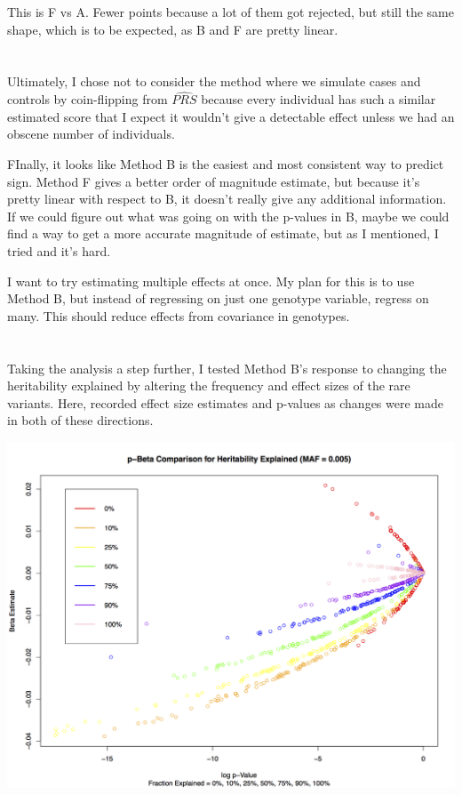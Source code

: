 \documentclass[11pt]{article} %
\begin{document}
This is F vs A. Fewer points because a lot of them got rejected, but still the same shape, which is to be expected, as B and F are pretty linear.

\section{}

Ultimately, I chose not to consider the method where we simulate cases and controls by coin-flipping from $\widehat{PRS}$ because every individual has such a similar estimated score that I expect it wouldn't give a detectable effect unless we had an obscene number of individuals.

FInally, it looks like Method B is the easiest and most consistent way to predict sign. Method F gives a better order of magnitude estimate, but because it's pretty linear with respect to B, it doesn't really give any additional information. If we could figure out what was going on with the p-values in B, maybe we could find a way to get a more accurate magnitude of estimate, but as I mentioned, I tried and it's hard.

I want to try estimating multiple effects at once. My plan for this is to use Method B, but instead of regressing on just one genotype variable, regress on many. This should reduce effects from covariance in genotypes.

\section{}

Taking the analysis a step further, I tested Method B's response to changing the heritability explained by altering the frequency and effect sizes of the rare variants. Here, recorded effect size estimates and p-values as changes were made in both of these directions.

\includegraphics[scale=0.5]{Understanding B/Constant MAF.pdf}
\end{document}
